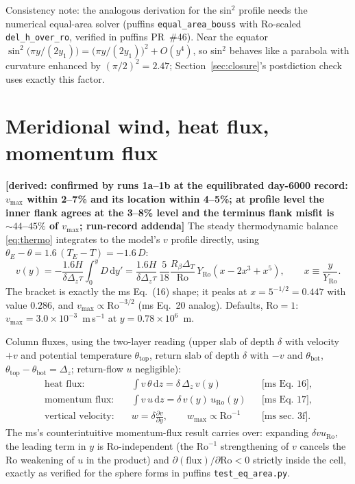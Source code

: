 \documentclass[11pt]{article}
\newcommand{\Ro}{\mathrm{Ro}}
\newcommand{\Rb}{R_\beta}
\newcommand{\dpar}[2]{\frac{\partial #1}{\partial #2}}
\begin{document}
Consistency note: the analogous derivation for the sin$^2$ profile needs
the numerical equal-area solver (puffins \texttt{equal\_area\_bouss} with
$\Ro$-scaled \texttt{del\_h\_over\_ro}, verified in puffins PR~\#46). Near
the equator $\sin^2\!\big(\pi y/(2 y_1)\big) = \big(\pi y/(2 y_1)\big)^2 +
O(y^4)$, so sin$^2$ behaves like a parabola with curvature enhanced by
$(\pi/2)^2 = 2.47$; Section~\ref{sec:closure}'s postdiction check uses
exactly this factor.

\section{Meridional wind, heat flux, momentum flux}
\label{sec:v}

\textbf{[derived: confirmed by runs 1a--1b at the equilibrated day-6000
record: $v_{\max}$ within 2--7\% and its location within 4--5\%; at
profile level the inner flank agrees at the 3--8\% level and the terminus
flank misfit is ${\sim}44$--$45\%$ of $v_{\max}$; run-record addenda]}
The steady thermodynamic balance \eqref{eq:thermo} integrates to the
model's $v$ profile directly, using $\theta_E - \theta = 1.6\,(T_E - T) =
-1.6\, D$:
\begin{equation}
  v(y)
  = -\frac{1.6 H}{\delta \Delta_z \tau} \int_0^y D\, \mathrm{d}y'
  = \frac{1.6 H}{\delta \Delta_z \tau}\,
    \frac{5}{18} \frac{\Rb \Delta_T}{\Ro}\,
    Y_{\Ro} \left( x - 2x^3 + x^5 \right),
  \qquad x \equiv \frac{y}{Y_{\Ro}}.
  \label{eq:v}
\end{equation}
The bracket is exactly the ms Eq.~(16) shape; it peaks at $x = 5^{-1/2} =
0.447$ with value $0.286$, and $v_{\max} \propto \Ro^{-3/2}$ (ms Eq.~20
analog). Defaults, $\Ro = 1$: $v_{\max} = 3.0\times 10^{-3}$~m\,s$^{-1}$ at
$y = 0.78\times 10^6$~m.

Column fluxes, using the two-layer reading (upper slab of depth $\delta$
with velocity $+v$ and potential temperature $\theta_{\mathrm{top}}$,
return slab of depth $\delta$ with $-v$ and $\theta_{\mathrm{bot}}$,
$\theta_{\mathrm{top}} - \theta_{\mathrm{bot}} = \Delta_z$; return-flow $u$
negligible):
\begin{align}
  \text{heat flux:} \quad
    &\int v\, \theta\, \mathrm{d}z = \delta\, \Delta_z\, v(y)
    &&\text{[ms Eq.~16]}, \\
  \text{momentum flux:} \quad
    &\int v\, u\, \mathrm{d}z = \delta\, v(y)\, u_{\Ro}(y)
    &&\text{[ms Eq.~17]}, \\
  \text{vertical velocity:} \quad
    &w = \delta \dpar{v}{y}, \qquad w_{\max} \propto \Ro^{-1}
    &&\text{[ms sec.~3f]}.
\end{align}
The ms's counterintuitive momentum-flux result carries over: expanding
$\delta v u_{\Ro}$, the leading term in $y$ is $\Ro$-independent (the
$\Ro^{-1}$ strengthening of $v$ cancels the $\Ro$ weakening of $u$ in the
product) and $\partial(\text{flux})/\partial \Ro < 0$ strictly inside the
cell, exactly as verified for the sphere forms in puffins
\texttt{test\_eq\_area.py}.
\end{document}
